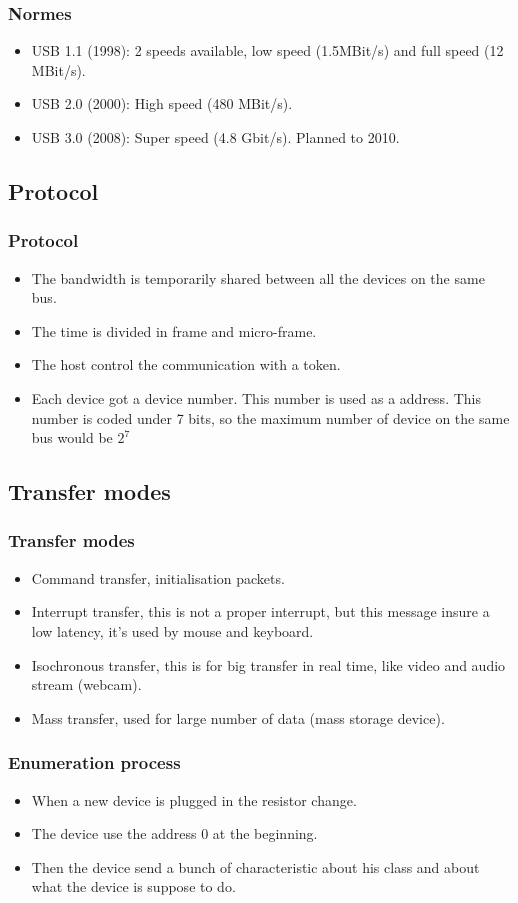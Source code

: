 \begin{frame}
\frametitle{Normes}
\begin{itemize}
\item USB 1.1 (1998): 2 speeds available, low speed (1.5MBit/s) and
full speed (12 MBit/s).
\item USB 2.0 (2000): High speed (480 MBit/s).
\item USB 3.0 (2008): Super speed (4.8 Gbit/s). Planned to 2010.
\end{itemize}
\end{frame}

\subsection{Protocol}
\begin{frame}
\frametitle{Protocol}
\begin{itemize}
\item The bandwidth is temporarily shared between all the devices on the
same bus.
\item The time is divided in frame and micro-frame.
\item The host control the communication with a token.
\item Each device got a device number. This number is used as a address.
This number is coded under 7 bits, so the maximum number of device on
the same bus would be $2^7$
\end{itemize}
\end{frame}
\subsection{Transfer modes}
\begin{frame}
\frametitle{Transfer modes}
\begin{itemize}
\item Command transfer, initialisation packets.
\item Interrupt transfer, this is not a proper interrupt, but this message insure a low latency, it's used by mouse and keyboard.
\item Isochronous transfer, this is for big transfer in real time, like video and audio stream (webcam).
\item Mass transfer, used for large number of data (mass storage device).
\end{itemize}
\end{frame}

\begin{frame}
\frametitle{Enumeration process}
\begin{itemize}
\item When a new device is plugged in the resistor change.
\item The device use the address 0 at the beginning.
\item Then the device send a bunch of characteristic about his class and about what the device is suppose to do.
\end{itemize}
\end{frame}

